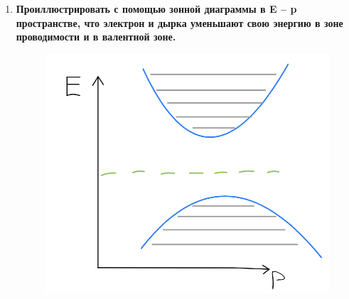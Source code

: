 \documentclass[a4paper]{article}
\begin{document}
\begin{enumerate}
    \item \textbf{Проиллюстрировать с помощью зонной диаграммы в E – p пространстве, что электрон и дырка уменьшают свою энергию в зоне проводимости и в валентной зоне.} \par 
    \begin{figure}[H]
        \begin{center}
            \includegraphics[scale=0.4]{p1.png}
        \end{center}
    \end{figure}

\end{enumerate}
\end{document}
